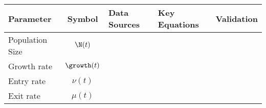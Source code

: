 \begin{tabular}{lclll}
	\toprule
	Parameter       &    Symbol    & Data Sources & Key Equations & Validation \\
	\midrule
	Population Size &   $\N(t)$    &              &               &            \\
	Growth rate     & $\growth(t)$ &              &               &            \\
	Entry rate      &   $\nu(t)$   &              &               &            \\
	Exit rate       &   $\mu(t)$   &              &               &            \\
	\bottomrule
\end{tabular}